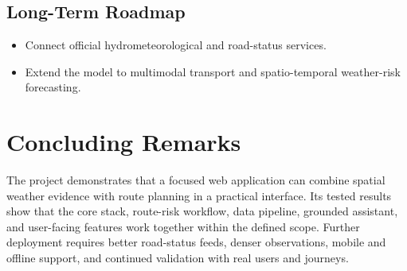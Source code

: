 \subsection{Long-Term Roadmap}
\begin{itemize}
    \item[-] Connect official hydrometeorological and road-status services.
    \item[-] Extend the model to multimodal transport and spatio-temporal weather-risk forecasting.
\end{itemize}

\section{Concluding Remarks}
\label{sec:closing_remarks}

The project demonstrates that a focused web application can combine spatial weather evidence with route planning in a practical interface. Its tested results show that the core stack, route-risk workflow, data pipeline, grounded assistant, and user-facing features work together within the defined scope. Further deployment requires better road-status feeds, denser observations, mobile and offline support, and continued validation with real users and journeys.
